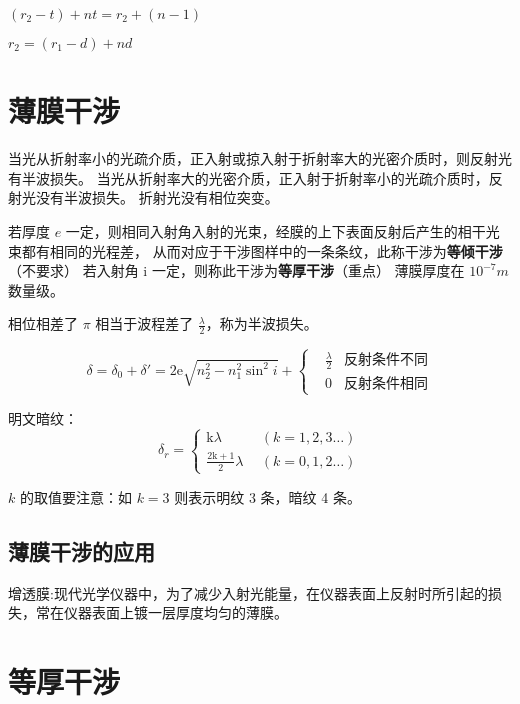 $(r_2-t)+nt=r_2+(n-1)$

$r_2=(r_1-d)+nd$

\section{薄膜干涉}

当光从折射率小的光疏介质，正入射或掠入射于折射率大的光密介质时，则反射光有半波损失。
当光从折射率大的光密介质，正入射于折射率小的光疏介质时，反射光没有半波损失。
折射光没有相位突变。

若厚度 $e$ 一定，则相同入射角入射的光束，经膜的上下表面反射后产生的相干光束都有相同的光程差，
从而对应于干涉图样中的一条条纹，此称干涉为\textbf{等倾干涉}（不要求）
若入射角 i 一定，则称此干涉为\textbf{等厚干涉}（重点）
薄膜厚度在 $10^{-7}m$ 数量级。

相位相差了 $\pi$ 相当于波程差了 $\frac{\lambda}{2}$，称为半波损失。

\begin{equation}
    \delta=\delta_0+\delta{}'=2\mathrm{e}\sqrt{n_2^2-n_1^2\sin^2{i}}+
    \left\{
    \begin{aligned}
         & \frac{\lambda}{2} & \mbox{反射条件不同} \\
         & 0                 & \mbox{反射条件相同}
    \end{aligned}
    \right.
\end{equation}

明文暗纹：
\begin{equation}
    \delta_{r}=
    \left\{
    \begin{aligned}
        \mathrm{k}\lambda{}             ~~ & (k=1,2,3\dots) \\
        \frac{2\mathrm{k}+1}{2}\lambda{}~~ & (k=0,1,2\dots)
    \end{aligned}
    \right.
\end{equation}

$k$ 的取值要注意：如 $k=3$ 则表示明纹 3 条，暗纹 4 条。



\subsection{薄膜干涉的应用}

增透膜:现代光学仪器中，为了减少入射光能量，在仪器表面上反射时所引起的损失，常在仪器表面上镀一层厚度均匀的薄膜。

\section{等厚干涉}

